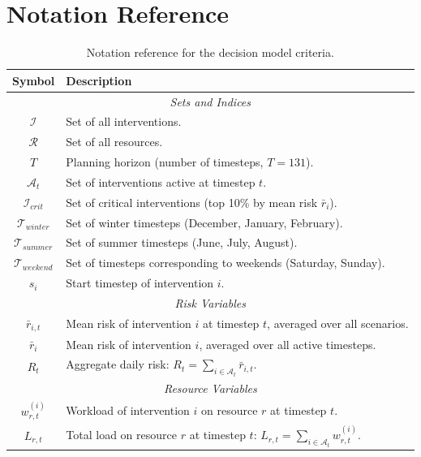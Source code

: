 \appendix
\newpage
\section{Notation Reference}
\label{app:notation}

\begin{table}[!h]
  \centering
  \small
    \caption{Notation reference for the decision model criteria.}
  \label{tab:notation}
  \begin{tabular}{|c|p{11.5cm}|}
    \hline
    \textbf{Symbol} & \textbf{Description}\\\hline
    \multicolumn{2}{|c|}{\textit{Sets and Indices}} \\\hline
    $\mathcal{I}$ & Set of all interventions. \\\hline
    $\mathcal{R}$ & Set of all resources. \\\hline
    $T$ & Planning horizon (number of timesteps, $T=131$). \\\hline
    $\mathcal{A}_t$ & Set of interventions active at timestep $t$. \\\hline
    $\mathcal{I}_{crit}$ & Set of critical interventions (top 10\% by mean risk $\bar{r}_i$). \\\hline
    $\mathcal{T}_{winter}$ & Set of winter timesteps (December, January, February). \\\hline
    $\mathcal{T}_{summer}$ & Set of summer timesteps (June, July, August). \\\hline
    $\mathcal{T}_{weekend}$ & Set of timesteps corresponding to weekends (Saturday, Sunday). \\\hline
    $s_i$ & Start timestep of intervention $i$. \\\hline
    \multicolumn{2}{|c|}{\textit{Risk Variables}} \\\hline
    $\bar{r}_{i,t}$ & Mean risk of intervention $i$ at timestep $t$, averaged over all scenarios. \\\hline
    $\bar{r}_i$ & Mean risk of intervention $i$, averaged over all active timesteps. \\\hline
    $R_t$ & Aggregate daily risk: $R_t = \sum_{i \in \mathcal{A}_t} \bar{r}_{i,t}$. \\\hline
    \multicolumn{2}{|c|}{\textit{Resource Variables}} \\\hline
    $w_{r,t}^{(i)}$ & Workload of intervention $i$ on resource $r$ at timestep $t$. \\\hline
    $L_{r,t}$ & Total load on resource $r$ at timestep $t$: $L_{r,t} = \sum_{i \in \mathcal{A}_t} w_{r,t}^{(i)}$. \\\hline

\end{tabular}
\end{table}
